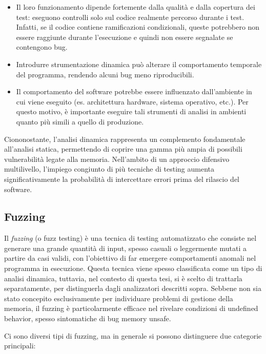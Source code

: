 \begin{itemize}
  \item Il loro funzionamento dipende fortemente dalla qualità e dalla copertura
    dei test: eseguono controlli solo sul codice realmente percorso durante i
    test. Infatti, se il codice contiene ramificazioni condizionali, queste potrebbero
    non essere raggiunte durante l'esecuzione e quindi non essere segnalate se contengono
    bug.

  \item Introdurre strumentazione dinamica può alterare il comportamento temporale
    del programma, rendendo alcuni bug meno riproducibili.

  \item Il comportamento del software potrebbe essere influenzato dall'ambiente in
    cui viene eseguito (es. architettura hardware, sistema operativo, etc.). Per
    questo motivo, è importante eseguire tali strumenti di analisi in ambienti quanto
    più simili a quello di produzione.
\end{itemize}

Ciononostante, l'analisi dinamica rappresenta un complemento fondamentale all'analisi
statica, permettendo di coprire una gamma più ampia di possibili vulnerabilità
legate alla memoria. Nell'ambito di un approccio difensivo multilivello, l'impiego
congiunto di più tecniche di testing aumenta significativamente la probabilità
di intercettare errori prima del rilascio del software.

\subsection{Fuzzing}
\label{sec:fuzzing}

Il \textit{fuzzing} (o fuzz testing) è una tecnica di testing automatizzato che
consiste nel generare una grande quantità di input, spesso casuali o leggermente
mutati a partire da casi validi, con l'obiettivo di far emergere comportamenti
anomali nel programma in esecuzione. Questa tecnica viene spesso classificata come
un tipo di analisi dinamica, tuttavia, nel contesto di questa tesi, si è scelto
di trattarla separatamente, per distinguerla dagli analizzatori descritti sopra.
Sebbene non sia stato concepito esclusivamente per individuare problemi di
gestione della memoria, il fuzzing è particolarmente efficace nel rivelare condizioni
di undefined behavior, spesso sintomatiche di bug memory unsafe.

\smallskip
Ci sono diversi tipi di fuzzing, ma in generale si possono distinguere due categorie
principali:

